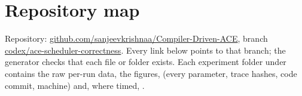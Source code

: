 \chapter{Repository map}
\label{app:repo}
Repository: \href{https://github.com/sanjeevkrishnaa/Compiler-Driven-ACE}{github.com/sanjeevkrishnaa/Compiler-Driven-ACE}, branch
\href{https://github.com/sanjeevkrishnaa/Compiler-Driven-ACE/tree/codex/ace-scheduler-correctness}{codex/ace-scheduler-correctness}. Every link below points to that branch; the generator checks that each file or folder exists.
Each experiment folder under  contains the raw per-run data, the figures,  (every parameter, trace hashes, code commit, machine) and, where timed, .

